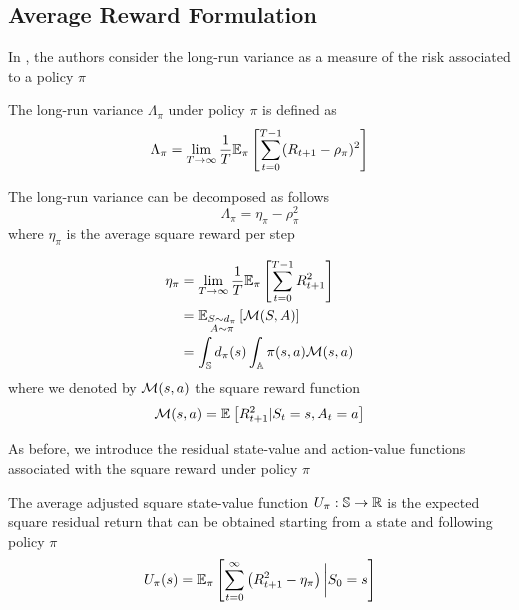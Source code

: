 \subsection{Average Reward Formulation}
In \cite{prashanth2014actor}, the authors consider the long-run variance as a measure of the risk associated to a policy $\pi$
\begin{definition}
	The long-run variance $\Lambda_\pi$ under policy $\pi$ is defined as
	\begin{equation}
		\begin{split}
			\Lambda_\pi &= \lim_{T \to \infty} \frac{1}{T} \E[\pi]{
			\sum^{T-1}_{t=0} (R_{t+1} - \rho_\pi)^2}\\
		\end{split}
	\end{equation}
\end{definition}
The long-run variance can be decomposed as follows
\begin{equation}
	\Lambda_\pi = \eta_\pi - \rho_\pi^2 
\end{equation}
where $\eta_\pi$ is the average square reward per step  
\begin{definition}
	\begin{equation}
		\begin{split}
			\eta_\pi &= \lim_{T\to\infty}\frac{1}{T}\E[\pi]{\sum_{t=0}^{T-1} R_{t+1}^2}\\
					 &= \E[\substack{S\sim d_\pi \\ A \sim \pi}]{\calM(S,A)}\\	
					 &= \int_\S d_\pi(s) \int_\A \pi(s,a) \calM(s,a)\\
		\end{split}
	\end{equation}
	where we denoted by $\calM(s,a)$ the square reward function
	\begin{equation}
		\calM(s,a) = \E{R_{t+1}^2 | S_t = s, A_t = a}
	\end{equation}
\end{definition}
As before, we introduce the residual state-value and action-value functions 
associated with the square reward under policy $\pi$
\begin{definition}
	The average adjusted square state-value function $U_\pi : \S \to \R$ is the
	expected square residual return that can be obtained starting from a state 
	and following policy $\pi$
	\begin{equation}
		U_\pi(s) = \E[\pi]{\sum^{\infty}_{t=0} \left(R_{t+1}^2 - \eta_\pi\right)
		\bigg| S_0 = s}
	\end{equation}
\end{definition}
